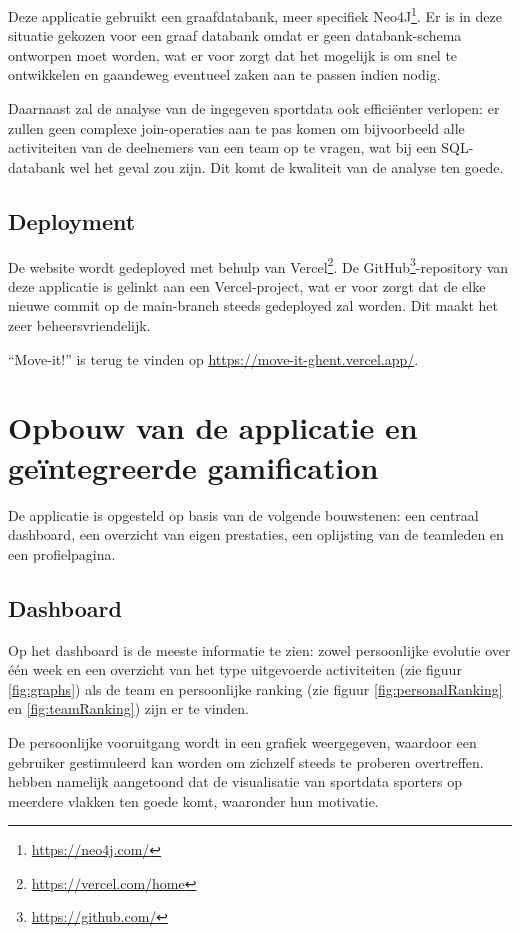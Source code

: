 Deze applicatie gebruikt een graafdatabank, meer specifiek Neo4J\footnote{\href{https://neo4j.com/}{https://neo4j.com/}}. Er is in deze situatie gekozen voor een graaf databank omdat er geen databank-schema ontworpen moet worden, wat er voor zorgt dat het mogelijk is om snel te ontwikkelen en gaandeweg eventueel zaken aan te passen indien nodig.

Daarnaast zal de analyse van de ingegeven sportdata ook efficiënter verlopen: er zullen geen complexe join-operaties aan te pas komen om bijvoorbeeld alle activiteiten van de deelnemers van een team op te vragen, wat bij een SQL-databank wel het geval zou zijn. Dit komt de kwaliteit van de analyse ten goede.

\subsection{Deployment}

De website wordt gedeployed met behulp van Vercel\footnote{\href{https://vercel.com/home}{https://vercel.com/home}}. De GitHub\footnote{\href{https://github.com/}{https://github.com/}}-repository van deze applicatie is gelinkt aan een Vercel-project, wat er voor zorgt dat de elke \linebreak nieuwe commit op de main-branch steeds gedeployed zal worden. Dit maakt het zeer beheersvriendelijk.

``Move-it!'' is terug te vinden op \href{https://move-it-ghent.vercel.app/}{https://move-it-ghent.vercel.app/}.

\section{Opbouw van de applicatie en geïntegreerde gamification}

De applicatie is opgesteld op basis van de volgende bouwstenen: een centraal dashboard, een overzicht van eigen prestaties, een oplijsting van de teamleden en een profielpagina.

\subsection{Dashboard}
Op het dashboard is de meeste informatie te zien: zowel persoonlijke evolutie over één week en een overzicht van het type uitgevoerde activiteiten (zie figuur \ref{fig:graphs}) als de team en persoonlijke ranking (zie figuur \ref{fig:personalRanking} en \ref{fig:teamRanking}) zijn er te vinden.

De persoonlijke vooruitgang wordt in een grafiek weergegeven, waardoor een gebruiker gestimuleerd kan worden om zichzelf steeds te proberen overtreffen. \linebreak \textcite{Schiewe2020} hebben namelijk aangetoond dat de visualisatie van sportdata sporters op meerdere vlakken ten goede komt, waaronder hun motivatie.

